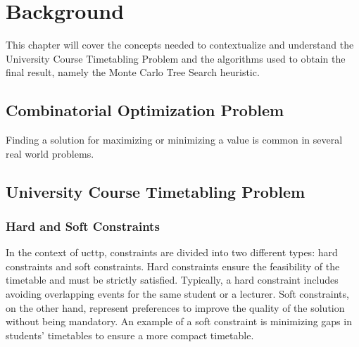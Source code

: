 
\chapter{Background}


\label{Background}

This chapter will cover the concepts needed to contextualize and understand the University Course Timetabling Problem and the algorithms used to obtain the final result, namely the Monte Carlo Tree Search heuristic.


\section{Combinatorial Optimization Problem}

Finding a solution for maximizing or minimizing a value is common in several real world problems.

\section{University Course Timetabling Problem}

\subsection{Hard and Soft Constraints}

In the context of \ac{ucttp}, constraints are divided into two different types: hard constraints and soft constraints. Hard constraints ensure the feasibility of the timetable and must be strictly satisfied. Typically, a hard constraint includes avoiding overlapping events for the same student or a lecturer. Soft constraints, on the other hand, represent preferences to improve the quality of the solution without being mandatory. An example of a soft constraint is minimizing gaps in students' timetables to ensure a more compact timetable.

